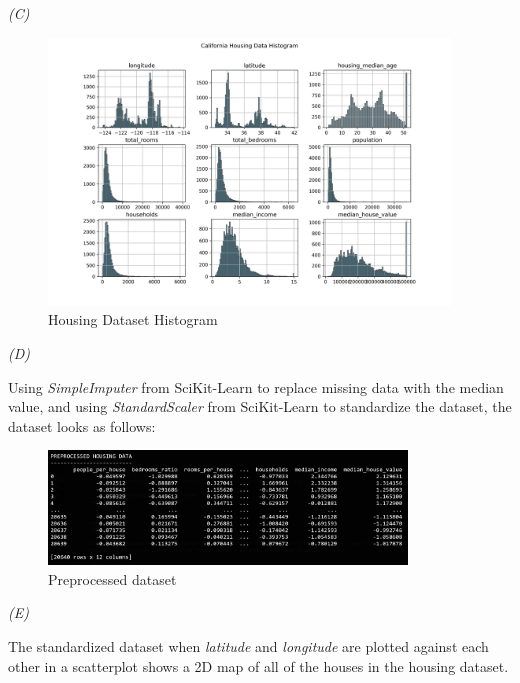 \documentclass[10pt]{article}
\begin{document}
\smallskip
\textit{(C)}
\begin{figure}[h]
    \includegraphics[width=0.95\textwidth]{../plots/q1/housing_histogram.png}
    \centering
    \caption{Housing Dataset Histogram}
\end{figure}

\smallskip
\textit{(D)}

\smallskip
Using \textit{SimpleImputer} from SciKit-Learn to replace missing data with the median value, and using \textit{StandardScaler} from SciKit-Learn to standardize the dataset, the dataset looks as follows:

\begin{figure}[h]
    \includegraphics[width=0.85\textwidth]{../logs/housing_pre.png}
    \centering
    \caption{Preprocessed dataset}
\end{figure}

\clearpage

\smallskip
\textit{(E)}

\smallskip
The standardized dataset when \textit{latitude} and \textit{longitude} are plotted against each other in a scatterplot shows a 2D map of all of the houses in the housing dataset.
\end{document}
